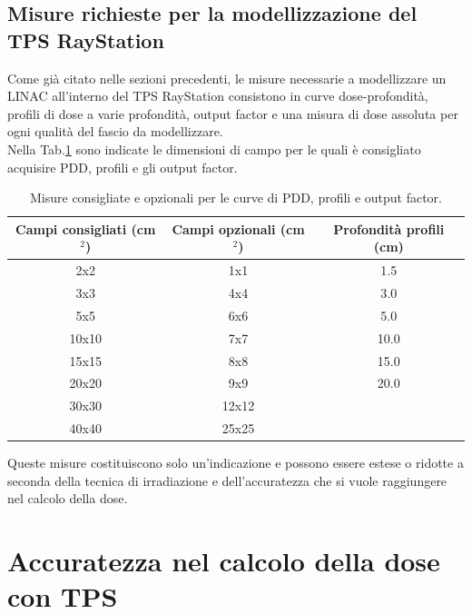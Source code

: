 \subsection{Misure richieste per la modellizzazione del TPS RayStation}
Come già citato nelle sezioni precedenti, le misure necessarie a modellizzare un LINAC all'interno del TPS RayStation consistono in curve dose-profondità, profili di dose a varie profondità, output factor e una misura di dose assoluta per ogni qualità del fascio da modellizzare.\\
Nella Tab.\ref{tab:meas} sono indicate le dimensioni di campo per le quali è consigliato acquisire PDD, profili e gli output factor.
\begin{table}
\begin{tabular}{@{}ccc@{}}
\toprule
Campi consigliati (cm$^2$) & Campi opzionali (cm$^2$) & Profondità profili (cm)\\
\midrule
2x2 & 1x1 & 1.5\\
3x3 & 4x4 & 3.0\\
5x5 & 6x6 & 5.0\\
10x10 & 7x7 & 10.0\\
15x15 & 8x8 & 15.0\\
20x20 & 9x9 & 20.0\\
30x30 & 12x12 & \\
40x40 & 25x25 & \\
\bottomrule
\end{tabular}
\caption{Misure consigliate e opzionali per le curve di PDD, profili e output factor.}
\label{tab:meas}
\end{table}
Queste misure costituiscono solo un'indicazione e possono essere estese o ridotte a seconda della tecnica di irradiazione e dell'accuratezza che si vuole raggiungere nel calcolo della dose.

\section{Accuratezza nel calcolo della dose con TPS}
